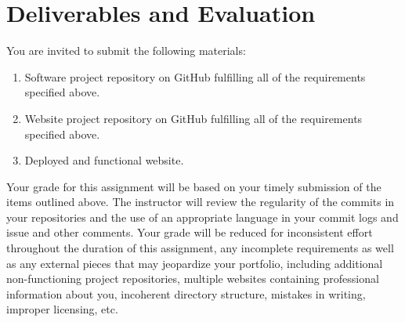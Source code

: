 \documentclass[11pt]{article}
\begin{document}
\section*{Deliverables and Evaluation}

You are invited to submit the following materials:
\begin{enumerate}
	\item Software project repository on GitHub fulfilling all of the requirements specified above. 
	\item Website project repository on GitHub fulfilling all of the requirements specified above. 
	\item Deployed and functional website. 
\end{enumerate}

Your grade for this assignment will be based on your timely submission of the items outlined above. The instructor will review the regularity of the commits in your repositories and the use of an appropriate language in your commit logs and issue and other comments. Your grade will be reduced for inconsistent effort throughout the duration of this assignment, any incomplete requirements as well as any external pieces that may jeopardize your portfolio, including additional non-functioning project repositories, multiple  websites containing professional information about you, incoherent directory structure, mistakes in writing, improper licensing, etc.
\end{document}
